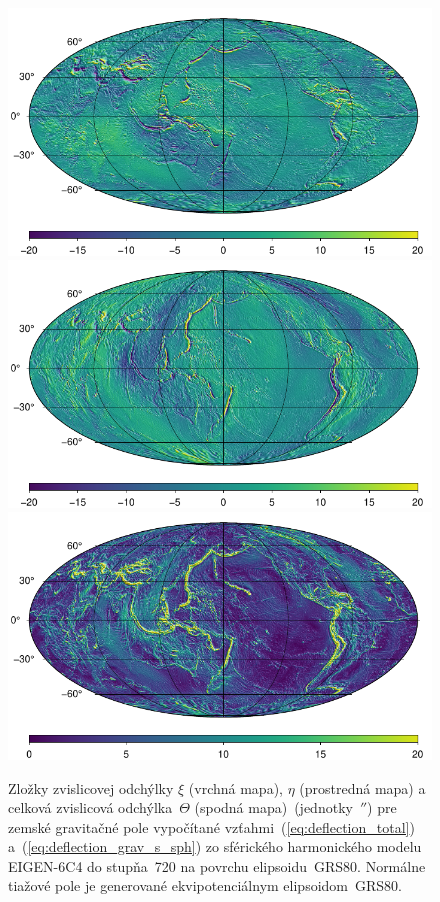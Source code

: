 \documentclass[a4paper,12pt]{book}
\begin{document}
\begin{figure}
\centering
\includegraphics{./fig-deflections-xi.pdf}
\includegraphics{./fig-deflections-eta.pdf}
\includegraphics{./fig-deflections-theta.pdf}
\caption{Zložky zvislicovej odchýlky $\xi$ (vrchná mapa), $\eta$ (prostredná 
mapa) a celková zvislicová odchýlka~$\Theta$ (spodná mapa)~(jednotky~$''$) pre 
zemské gravitačné pole vypočítané vzťahmi~(\ref{eq:deflection_total}) 
a~(\ref{eq:deflection_grav_s_sph}) zo sférického harmonického modelu EIGEN-6C4 
do stupňa~720 na povrchu elipsoidu~GRS80.  Normálne tiažové pole je generované 
ekvipotenciálnym elipsoidom~GRS80.}
\label{fig:deflections_ggm}
\end{figure}
\end{document}
